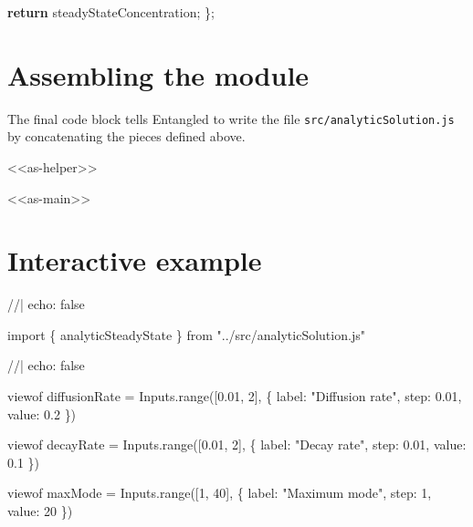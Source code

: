 \documentclass[
  letterpaper,
  DIV=11,
  numbers=noendperiod]{scrreprt}
\newenvironment{Shaded}{\begin{snugshade}}{\end{snugshade}}
\newcommand{\ControlFlowTok}[1]{\textcolor[rgb]{0.00,0.23,0.31}{\textbf{#1}}}
\newcommand{\ImportTok}[1]{\textcolor[rgb]{0.00,0.46,0.62}{#1}}
\newcommand{\NormalTok}[1]{\textcolor[rgb]{0.00,0.23,0.31}{#1}}
\newcommand{\OperatorTok}[1]{\textcolor[rgb]{0.37,0.37,0.37}{#1}}
\begin{document}
\begin{Shaded}
\begin{Highlighting}[]
    \ControlFlowTok{return}\NormalTok{ steadyStateConcentration}\OperatorTok{;}
\NormalTok{\}}\OperatorTok{;}
\end{Highlighting}
\end{Shaded}

\section{Assembling the module}\label{assembling-the-module-2}

The final code block tells Entangled to write the file
\texttt{src/analyticSolution.js} by concatenating the pieces defined
above.

\begin{Shaded}
\begin{Highlighting}[]
\OperatorTok{\textless{}\textless{}}\ImportTok{as}\OperatorTok{{-}}\NormalTok{helper}\OperatorTok{\textgreater{}\textgreater{}}

\OperatorTok{\textless{}\textless{}}\ImportTok{as}\OperatorTok{{-}}\NormalTok{main}\OperatorTok{\textgreater{}\textgreater{}}
\end{Highlighting}
\end{Shaded}

\section{Interactive example}\label{interactive-example}

\begin{Shaded}
\begin{Highlighting}[]
\NormalTok{//| echo: false}

\NormalTok{import \{ analyticSteadyState \} from "../src/analyticSolution.js"}
\end{Highlighting}
\end{Shaded}

\begin{Shaded}
\begin{Highlighting}[]
\NormalTok{//| echo: false}

\NormalTok{viewof diffusionRate = Inputs.range([0.01, 2], \{}
\NormalTok{  label: "Diffusion rate",}
\NormalTok{  step: 0.01,}
\NormalTok{  value: 0.2}
\NormalTok{\})}

\NormalTok{viewof decayRate = Inputs.range([0.01, 2], \{}
\NormalTok{  label: "Decay rate",}
\NormalTok{  step: 0.01,}
\NormalTok{  value: 0.1}
\NormalTok{\})}

\NormalTok{viewof maxMode = Inputs.range([1, 40], \{}
\NormalTok{  label: "Maximum mode",}
\NormalTok{  step: 1,}
\NormalTok{  value: 20}
\NormalTok{\})}
\end{Highlighting}
\end{Shaded}
\end{document}
